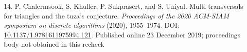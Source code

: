 \documentclass[11pt,a4paper]{article}
\newenvironment{CSLReferences}[2]{\par\setlength{\parindent}{0pt}\setlength{\parskip}{6pt}}{}
\begin{document}
\begin{CSLReferences}{0}{1}
\par{}\label{ref-cksu2020proceedings}
14. P. Chalermsook, S. Khuller, P. Sukprasert, and S. Uniyal. Multi-transversals for triangles and the tuza's conjecture. \emph{Proceedings of the 2020 ACM-SIAM symposium on discrete algorithms} (2020), 1955--1974. DOI: \href{https://doi.org/10.1137/1.9781611975994.121}{10.1137/1.9781611975994.121}. Published online 23 December 2019; proceedings body not obtained in this recheck

\end{CSLReferences}
\end{document}
